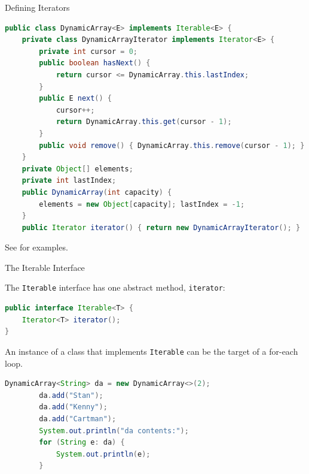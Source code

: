 \documentclass{beamer}
\begin{document}
\begin{frame}[fragile]{Defining Iterators}

\vspace{-.1in}
\begin{lstlisting}[language=Java]
public class DynamicArray<E> implements Iterable<E> {
    private class DynamicArrayIterator implements Iterator<E> {
        private int cursor = 0;
        public boolean hasNext() {
            return cursor <= DynamicArray.this.lastIndex;
        }
        public E next() {
            cursor++;
            return DynamicArray.this.get(cursor - 1);
        }
        public void remove() { DynamicArray.this.remove(cursor - 1); }
    }
    private Object[] elements;
    private int lastIndex;
    public DynamicArray(int capacity) {
        elements = new Object[capacity]; lastIndex = -1;
    }
    public Iterator iterator() { return new DynamicArrayIterator(); }
\end{lstlisting}
\vspace{-.1in}
See  for examples.

\end{frame}

\begin{frame}[fragile]{The Iterable Interface}

The {\tt Iterable} interface has one abstract method, {\tt iterator}:

\begin{lstlisting}[language=Java]
public interface Iterable<T> {
    Iterator<T> iterator();
}
\end{lstlisting}

An instance of a class that implements {\tt Iterable} can be the target of a for-each loop.
\begin{lstlisting}[language=Java]
        DynamicArray<String> da = new DynamicArray<>(2);
        da.add("Stan");
        da.add("Kenny");
        da.add("Cartman");
        System.out.println("da contents:");
        for (String e: da) {
            System.out.println(e);
        }

\end{lstlisting}

\end{frame}
\end{document}
